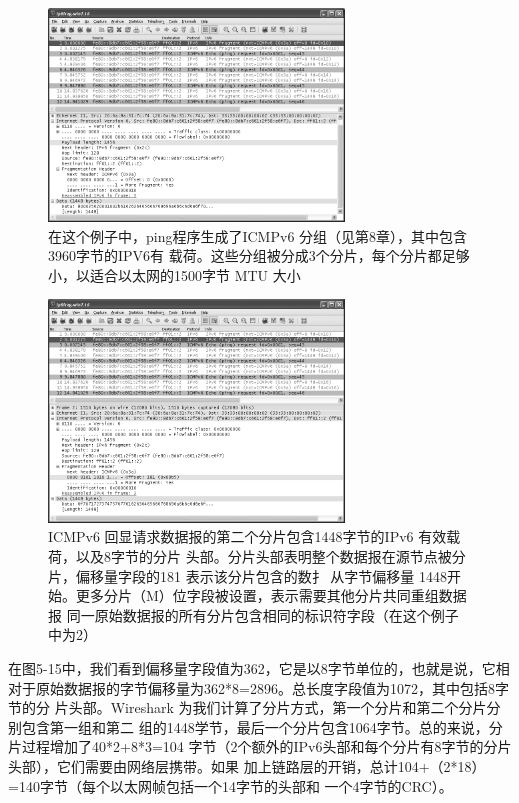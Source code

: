 \begin{figure}[!htb]
  \centering
  \includegraphics[width=0.7\textwidth]{imgs/5/5-13.png}
  \caption{在这个例子中，ping程序生成了ICMPv6 分组（见第8章），其中包含3960字节的IPV6有
  载荷。这些分组被分成3个分片，每个分片都足够小，以适合以太网的1500字节 MTU 大小}
\end{figure}

\begin{figure}[!htb]
  \centering
  \includegraphics[width=0.7\textwidth]{imgs/5/5-14.png}
  \caption{ICMPv6 回显请求数据报的第二个分片包含1448字节的IPv6 有效载荷，以及8字节的分片
    头部。分片头部表明整个数据报在源节点被分片，偏移量字段的181 表示该分片包含的数扌
    从字节偏移量 1448开始。更多分片（M）位字段被设置，表示需要其他分片共同重组数据报
  同一原始数据报的所有分片包含相同的标识符字段（在这个例子中为2）}
\end{figure}

在图5-15中，我们看到偏移量字段值为362，它是以8字节单位的，也就是说，它相
对于原始数据报的字节偏移量为362*8=2896。总长度字段值为1072，其中包括8字节的分
片头部。Wireshark 为我们计算了分片方式，第一个分片和第二个分片分别包含第一组和第二
组的1448学节，最后一个分片包含1064字节。总的来说，分片过程增加了40*2+8*3=104
字节（2个额外的IPv6头部和每个分片有8字节的分片头部），它们需要由网络层携带。如果
加上链路层的开销，总计104+（2*18）=140字节（每个以太网帧包括一个14字节的头部和
一个4字节的CRC）。

